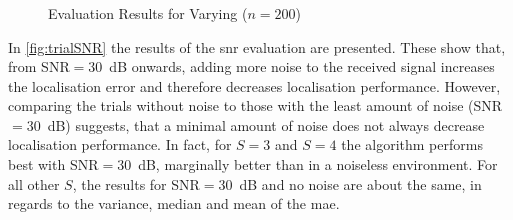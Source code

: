 \subsubsection*{}
\begin{figure}[!ht]
\iftoggle{quick}{%
    \texttt{[image: plots/boxplots/boxplot-joined-SNR]}
}{%
    
}
	\caption[Evaluation Results for Varying ]{Evaluation Results for Varying  ($n=200$)}
	\label{fig:trialSNR}
\end{figure}

In \autoref{fig:trialSNR} the results of the \gls{snr} evaluation are presented. These show that, from SNR$=30$~dB onwards, adding more noise to the received signal increases the localisation error and therefore decreases localisation performance. However, comparing the trials without noise to those with the least amount of noise (SNR$=30$~dB) suggests, that a minimal amount of noise does not always decrease localisation performance. In fact, for $S=3$ and $S=4$ the algorithm performs best with SNR$=30$~dB, marginally better than in a noiseless environment. For all other $S$, the results for SNR$=30$~dB and no noise are about the same, in regards to the variance, median and mean of the \gls{mae}.
